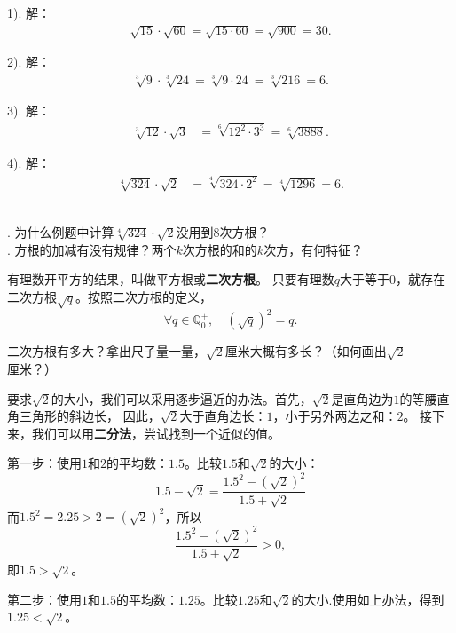 \documentclass[12pt,UTF8]{ctexbook}
\begin{document}
\begin{so}
    1). 解： 
    \begin{align*}
        \sqrt{15}\cdot\sqrt{60} = \sqrt{15\cdot 60} = \sqrt{900} = 30. 
    \end{align*}

    2). 解：
    \begin{align*}
        \sqrt[3]{9}\cdot\sqrt[3]{24} = \sqrt[3]{9\cdot 24} = \sqrt[3]{216} = 6. 
    \end{align*}

    3). 解：
    \begin{align*}
        \sqrt[3]{12}\cdot\sqrt{3} &= \sqrt[6]{12^2\cdot 3^3} = \sqrt[6]{3888}. 
    \end{align*}

    4). 解：
    \begin{align*}
        \sqrt[4]{324}\cdot\sqrt{2} &= \sqrt[4]{324\cdot 2^2} = \sqrt[4]{1296} = 6. 
    \end{align*}
           
\end{so}

\begin{sk}
    \mbox{}\\
    . 为什么例题中计算$\sqrt[4]{324}\cdot\sqrt{2}$没用到$8$次方根？\\
    . 方根的加减有没有规律？两个$k$次方根的和的$k$次方，有何特征？
\end{sk}

有理数开平方的结果，叫做平方根或\textbf{二次方根}。
只要有理数$q$大于等于$0$，就存在二次方根$\sqrt{q}$。按照二次方根的定义，
$$\forall q\in\mathbb{Q}_0^+, \quad \left(\sqrt{q}\right)^2 = q.$$

二次方根有多大？拿出尺子量一量，$\sqrt{2}$厘米大概有多长？（如何画出$\sqrt{2}$厘米？）

要求$\sqrt{2}$的大小，我们可以采用逐步逼近的办法。首先，$\sqrt{2}$是直角边为$1$的等腰直角三角形的斜边长，
因此，$\sqrt{2}$大于直角边长：$1$，小于另外两边之和：$2$。
接下来，我们可以用\textbf{二分法}，尝试找到一个近似的值。

第一步：使用$1$和$2$的平均数：$1.5$。比较$1.5$和$\sqrt{2}$的大小：
$$ 1.5 - \sqrt{2} = \frac{1.5^2 - \left(\sqrt{2}\right)^2}{1.5 + \sqrt{2}} $$
而$1.5^2 = 2.25 > 2 = \left(\sqrt{2}\right)^2$，所以
$$ \frac{1.5^2 - \left(\sqrt{2}\right)^2}{1.5 + \sqrt{2}} > 0,$$
即$1.5 > \sqrt{2}$。

第二步：使用$1$和$1.5$的平均数：$1.25$。比较$1.25$和$\sqrt{2}$的大小.使用如上办法，得到
$1.25 < \sqrt{2}$。
\end{document}

